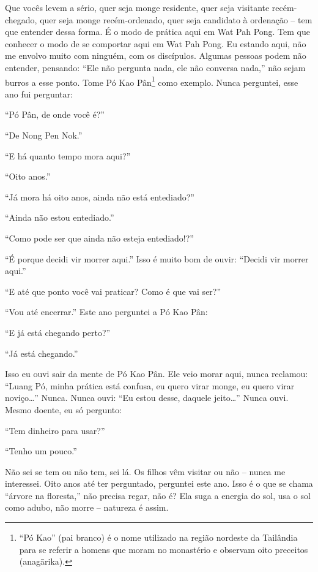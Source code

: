 Que vocês levem a sério, quer seja monge residente, quer seja
visitante recém-chegado, quer seja monge recém-ordenado, quer seja
candidato à ordenação – tem que entender dessa forma. É o modo de
prática aqui em Wat Pah Pong. Tem que conhecer o modo de se comportar
aqui em Wat Pah Pong. Eu estando aqui, não me envolvo muito com
ninguém, com os discípulos. Algumas pessoas podem não entender,
pensando: “Ele não pergunta nada, ele não conversa nada,” não sejam
burros a esse ponto. Tome Pó Kao Pân\footnote{“Pó Kao” (pai branco) é o
nome utilizado na região nordeste da Tailândia para se referir a homens
que moram no monastério e observam oito preceitos (anagārika).} como
exemplo. Nunca perguntei, esse ano fui perguntar: 

“Pó Pân, de onde você é?” 

“De Nong Pen Nok.”

“E há quanto tempo mora aqui?”

“Oito anos.” 

“Já mora há oito anos, ainda não está entediado?” 

“Ainda não estou entediado.”

“Como pode ser que ainda não esteja entediado!?”

“É porque decidi vir morrer aqui.” Isso é muito bom de ouvir:
“Decidi vir morrer aqui.” 

“E até que ponto você vai praticar? Como é que vai ser?”

“Vou até encerrar.” Este ano perguntei a Pó Kao Pân:

“E já está chegando perto?”

“Já está chegando.” 

Isso eu ouvi sair da mente de Pó Kao Pân. Ele veio morar aqui, nunca
reclamou: “Luang Pó, minha prática está confusa, eu quero virar monge,
eu quero virar noviço\ldots{}” Nunca. Nunca ouvi: “Eu estou desse, daquele
jeito\ldots{}” Nunca ouvi. Mesmo doente, eu só pergunto:

“Tem dinheiro para usar?” 

“Tenho um pouco.” 

Não sei se tem ou não tem, sei lá. Os filhos vêm visitar ou não –
nunca me interessei. Oito anos até ter perguntado, perguntei este ano.
Isso é o que se chama “árvore na floresta,” não precisa regar, não é?
Ela suga a energia do sol, usa o sol como adubo, não morre – natureza é
assim.
